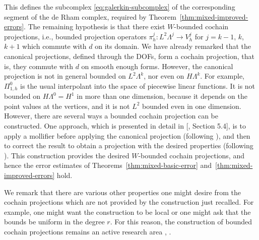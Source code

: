 {This defines the subcomplex \eqref{eq:galerkin-subcomplex} of the corresponding segment of the de Rham complex, required by Theorem~\ref{thm:mixed-improved-errors}. The remaining hypothesis is that there exist $W$-bounded cochain projections, i.e., bounded projection operators $\pi_h^j:L^2\Lambda^j\to V_h^j$ for $j=k-1$, $k$, $k+1$ which commute with $d$ on its domain. We have already remarked that the canonical projections, defined through the DOFs, form a cochain projection, that is, they commute with $d$ on smooth enough forms. However, the canonical projection is not in general bounded on $L^2\Lambda^k$, nor even on $H\Lambda^k$. For example, $\Pi_{1,h}^0$ is the usual interpolant into the space of piecewise linear functions. It is not bounded on $H\Lambda^0=H^1$ in more than one dimension, because it depends on the point values at the vertices, and it is not $L^2$ bounded even in one dimension. However, there are several ways a bounded cochain projection can be constructed. One approach, which is presented in detail in [, Section 5.4], is to apply a mollifier before applying the canonical projection (following ), and then to correct the result to obtain a projection with the desired properties (following ). This construction provides the desired $W$-bounded cochain projections, and hence the error estimates of Theorems~\ref{thm:mixed-basic-error} and~\ref{thm:mixed-improved-errors} hold.}

{We remark that there are various other properties one might desire from the cochain projections which are not provided by the construction just recalled. For example, one might want the construction to be local or one might ask that the bounds be uniform in the degree $r$. For this reason, the construction of bounded cochain projections remains an active research area , .}
